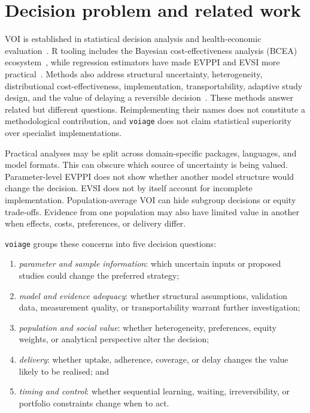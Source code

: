 \section{Decision problem and related work}

VOI is established in statistical decision analysis and health-economic
evaluation~\cite{claxton1999irrelevance,briggs2006decision}. R tooling includes
the Bayesian cost-effectiveness analysis (BCEA)
ecosystem~\cite{baio2017bcea}, while regression estimators have made EVPPI and
EVSI more practical~\cite{strong2014evppi,strong2015evsi}. Methods also address
structural uncertainty, heterogeneity, distributional cost-effectiveness,
implementation, transportability, adaptive study design, and the value of
delaying a reversible decision~\cite{jackson2011structural,espinoza2014heterogeneity,asaria2016distributional,fenwick2008implementation,bareinboim2016datafusion,flight2022sequential,palmer2000options}.
These methods answer related but different questions. Reimplementing their
names does not constitute a methodological contribution, and
\texttt{voiage} does not claim statistical superiority over specialist
implementations.

Practical analyses may be split across domain-specific packages, languages,
and model formats. This can obscure which source of uncertainty is being
valued. Parameter-level EVPPI does not show whether another model structure
would change the decision. EVSI does not by itself account for incomplete
implementation. Population-average VOI can hide subgroup decisions or equity
trade-offs. Evidence from one population may also have limited value in
another when effects, costs, preferences, or delivery differ.

\texttt{voiage} groups these concerns into five decision questions:
\begin{enumerate}
  \item \emph{parameter and sample information}: which uncertain inputs or
  proposed studies could change the preferred strategy;
  \item \emph{model and evidence adequacy}: whether structural assumptions,
  validation data, measurement quality, or transportability warrant further
  investigation;
  \item \emph{population and social value}: whether heterogeneity, preferences,
  equity weights, or analytical perspective alter the decision;
  \item \emph{delivery}: whether uptake, adherence, coverage, or delay changes
  the value likely to be realised; and
  \item \emph{timing and control}: whether sequential learning, waiting,
  irreversibility, or portfolio constraints change when to act.
\end{enumerate}

